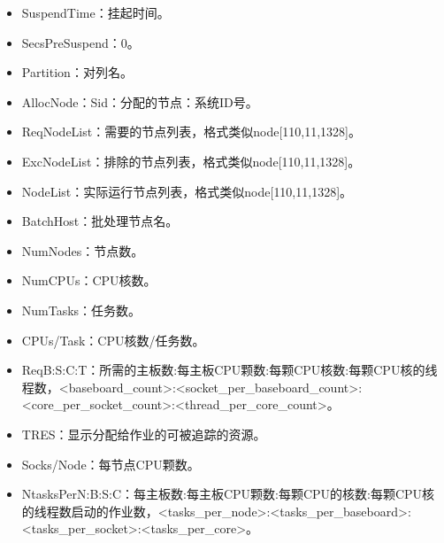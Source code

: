 \documentclass[a4paper,12pt,english]{sphinxmanual}
\begin{document}
\begin{itemize}
\item {} 
\sphinxAtStartPar
SuspendTime：挂起时间。

\item {} 
\sphinxAtStartPar
SecsPreSuspend：0。

\item {} 
\sphinxAtStartPar
Partition：对列名。

\item {} 
\sphinxAtStartPar
AllocNode：Sid：分配的节点：系统ID号。

\item {} 
\sphinxAtStartPar
ReqNodeList：需要的节点列表，格式类似node{[}1\sphinxhyphen{}10,11,13\sphinxhyphen{}28{]}。

\item {} 
\sphinxAtStartPar
ExcNodeList：排除的节点列表，格式类似node{[}1\sphinxhyphen{}10,11,13\sphinxhyphen{}28{]}。

\item {} 
\sphinxAtStartPar
NodeList：实际运行节点列表，格式类似node{[}1\sphinxhyphen{}10,11,13\sphinxhyphen{}28{]}。

\item {} 
\sphinxAtStartPar
BatchHost：批处理节点名。

\item {} 
\sphinxAtStartPar
NumNodes：节点数。

\item {} 
\sphinxAtStartPar
NumCPUs：CPU核数。

\item {} 
\sphinxAtStartPar
NumTasks：任务数。

\item {} 
\sphinxAtStartPar
CPUs/Task：CPU核数/任务数。

\item {} 
\sphinxAtStartPar
ReqB:S:C:T：所需的主板数:每主板CPU颗数:每颗CPU核数:每颗CPU核的线程数，<baseboard\_count>:<socket\_per\_baseboard\_count>:<core\_per\_socket\_count>:<thread\_per\_core\_count>。

\item {} 
\sphinxAtStartPar
TRES：显示分配给作业的可被追踪的资源。

\item {} 
\sphinxAtStartPar
Socks/Node：每节点CPU颗数。

\item {} 
\sphinxAtStartPar
NtasksPerN:B:S:C：每主板数:每主板CPU颗数:每颗CPU的核数:每颗CPU核的线程数启动的作业数，<tasks\_per\_node>:<tasks\_per\_baseboard>:<tasks\_per\_socket>:<tasks\_per\_core>。


\end{itemize}
\end{document}
